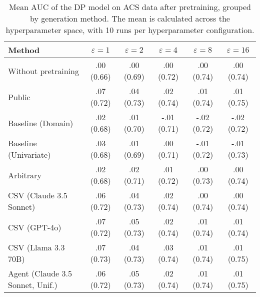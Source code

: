 \begin{table}[h!]
    \centering
    \caption{Mean AUC of the DP model on ACS data after pretraining, grouped by generation method. The mean is calculated across the hyperparameter space, with 10 runs per hyperparameter configuration.}
    \label{tab:epsilon_comparison}
    \begin{tabular}{lccccc}
    \toprule
    Method & $\varepsilon=1$ & $\varepsilon=2$ & $\varepsilon=4$ & $\varepsilon=8$ & $\varepsilon=16$ \\
    \midrule
    Without pretraining & .00 {\small (0.66)} & .00 {\small (0.69)} & .00 {\small (0.72)} & .00 {\small (0.74)} & .00 {\small (0.74)} \\
    \arrayrulecolor{black!50!}\midrule
    Public & .07 {\small (0.72)} & .04 {\small (0.73)} & \cellcolor{bronze!30}.02 {\small (0.74)} & \cellcolor{silver!30}.01 {\small (0.74)} & \cellcolor{bronze!30}.01 {\small (0.75)} \\
    \arrayrulecolor{black!50!}\midrule
    Baseline (Domain) & .02 {\small (0.68)} & .01 {\small (0.70)} & -.01 {\small (0.71)} & -.02 {\small (0.72)} & -.02 {\small (0.72)} \\
    Baseline (Univariate) & .03 {\small (0.68)} & .01 {\small (0.69)} & .00 {\small (0.71)} & -.01 {\small (0.72)} & -.01 {\small (0.73)} \\
    \arrayrulecolor{black!50!}\midrule
    Arbitrary & .02 {\small (0.68)} & .02 {\small (0.71)} & .01 {\small (0.72)} & .00 {\small (0.73)} & .00 {\small (0.74)} \\
    \arrayrulecolor{black!50!}\midrule
    CSV (Claude 3.5 Sonnet) & .06 {\small (0.72)} & .04 {\small (0.73)} & .02 {\small (0.74)} & .00 {\small (0.74)} & .00 {\small (0.74)} \\
    CSV (GPT-4o) & \cellcolor{bronze!30}.07 {\small (0.72)} & \cellcolor{silver!30}.05 {\small (0.73)} & .02 {\small (0.74)} & \cellcolor{silver!30}.01 {\small (0.74)} & .01 {\small (0.74)} \\
    CSV (Llama 3.3 70B) & \cellcolor{silver!30}.07 {\small (0.73)} & .04 {\small (0.73)} & \cellcolor{silver!30}.03 {\small (0.74)} & \cellcolor{bronze!30}.01 {\small (0.74)} & \cellcolor{silver!30}.01 {\small (0.75)} \\
    \arrayrulecolor{black!50!}\midrule
    Agent (Claude 3.5 Sonnet, Unif.) & .06 {\small (0.72)} & \cellcolor{bronze!30}.05 {\small (0.73)} & .02 {\small (0.74)} & \cellcolor{silver!30}.01 {\small (0.74)} & \cellcolor{silver!30}.01 {\small (0.75)} \\

\end{tabular}
\end{table}
